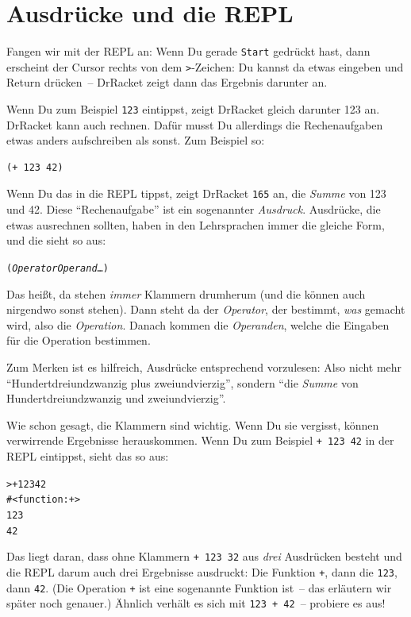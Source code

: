 \section{Ausdrücke und die REPL}

Fangen wir mit der REPL an: Wenn Du gerade \texttt{Start} gedrückt
hast, dann erscheint der Cursor rechts von dem \verb|>|-Zeichen: Du
kannst da etwas eingeben und Return drücken~-- DrRacket zeigt dann
das Ergebnis darunter an.

Wenn Du zum Beispiel \texttt{123} eintippst, zeigt DrRacket gleich
darunter 123 an.  DrRacket kann auch rechnen.  Dafür musst Du
allerdings die Rechenaufgaben etwas anders aufschreiben als sonst.
Zum Beispiel so:
%
\begin{verbatim}
(+ 123 42)
\end{verbatim}
%
Wenn Du das in die REPL tippst, zeigt DrRacket \texttt{165} an, die
\textit{Summe} von 123 und 42.  Diese "`Rechenaufgabe"'
ist ein sogenannter \textit{Ausdruck}.  Ausdrücke, die
etwas ausrechnen sollten, haben in den Lehrsprachen immer die gleiche
Form, und die sieht so aus:
%
\begin{alltt}
(\textnormal{\textit{Operator}} \textnormal{\textit{Operand}} \ldots)
\end{alltt}
%
Das heißt, da stehen \emph{immer} Klammern drumherum
(und die können auch nirgendwo sonst stehen).  Dann steht da der
\textit{Operator}, der bestimmt, \emph{was} gemacht
wird, also die \textit{Operation}.  Danach kommen die
\textit{Operanden}, welche die Eingaben
für die Operation bestimmen.

Zum Merken ist es hilfreich, Ausdrücke entsprechend vorzulesen: Also
nicht mehr "`Hundertdreiundzwanzig plus zweiundvierzig"', sondern
"`die \emph{Summe} von Hundertdreiundzwanzig und zweiundvierzig"'.

Wie schon gesagt, die Klammern sind wichtig.  Wenn Du sie vergisst,
können verwirrende Ergebnisse herauskommen.  Wenn Du zum Beispiel
\texttt{+ 123 42} in der REPL eintippst, sieht das so aus:
%
\begin{alltt}
> + {\color{green}123 42}
{\color{blue}#<function:+>
123
42}
\end{alltt}
%
Das liegt daran, dass ohne Klammern \texttt{+ 123 32} aus \emph{drei}
Ausdrücken besteht und die REPL darum auch drei Ergebnisse ausdruckt:
Die Funktion \texttt{+}, dann die \texttt{123}, dann \texttt{42}.
(Die Operation \texttt{+} ist eine sogenannte Funktion ist~-- das
erläutern wir später noch genauer.)  Ähnlich verhält es sich mit
\texttt{123 + 42}~-- probiere es aus!

